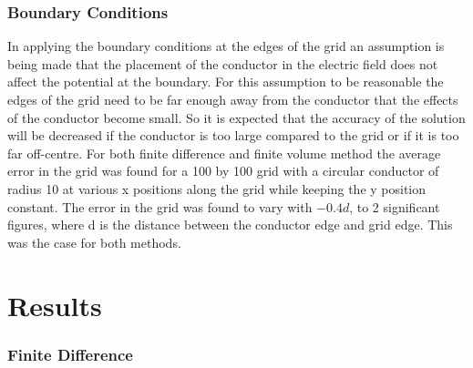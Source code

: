 \documentclass[aps,twocolumn,pre,nofootinbib]{revtex4}
\begin{document}
\subsubsection{Boundary Conditions}

In applying the boundary conditions at the edges of the grid an assumption is being made that the placement of the conductor in the electric field does not affect the potential at the boundary. For this assumption to be reasonable the edges of the grid need to be far enough away from the conductor that the effects of the conductor become small. So it is expected that the accuracy of the solution will be decreased if the conductor is too large compared to the grid or if it is too far off-centre. For both finite difference and finite volume method the average error in the grid was found for a 100 by 100 grid with a circular conductor of radius 10 at various x positions along the grid while keeping the y position constant. The error in the grid was found to vary with \(-0.4d\), to 2 significant figures, where d is the distance between the conductor edge and grid edge. This was the case for both methods. 
\section{Results}

\subsubsection{Finite Difference}
\end{document}
